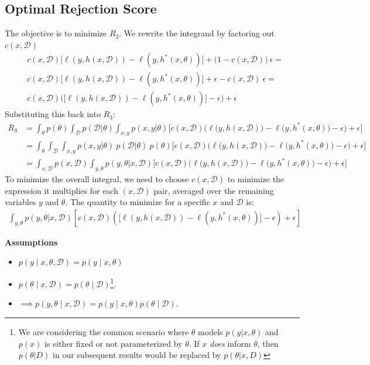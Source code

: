 \subsection{Optimal Rejection Score}
The objective is to minimize $R_3$. We rewrite the integrand by factoring out $c(x,\mathcal{D})$
\begin{align}
&c(x,\mathcal{D}) \big[ \ell(y,h(x,\mathcal{D})) - \ell(y,h^*(x,\theta)) \big]
+ \big(1 - c(x,\mathcal{D})\big)\ \epsilon = \nonumber \\
&c(x,\mathcal{D})\big[\ell(y,h(x,\mathcal{D})) - \ell(y,h^*(x,\theta))\big] + \epsilon - c(x,\mathcal{D})\ \epsilon = \nonumber \\
&c(x,\mathcal{D})\Big(\big[\ell(y,h(x,\mathcal{D})) - \ell(y,h^*(x,\theta))\big] - \epsilon\Big) + \epsilon
\end{align}
Substituting this back into $R_3$:
\begin{align}
R_{3} &= \int_{\theta} p(\theta) \int_{\mathcal{D}} p(\mathcal{D}|\theta)\int_{x,y} p(x,y|\theta) \Bigg[ c(x,\mathcal{D})\Big(\ell\big(y,h(x,\mathcal{D})\big) - \ell\big(y,h^*(x,\theta)\big) - \epsilon\Big) + \epsilon \Bigg]\nonumber \\
&= \int_{\theta} \int_{\mathcal{D}} \int_{x,y} p(x,y|\theta)\ p(\mathcal{D}|\theta) \ p(\theta) \Bigg[ c(x,\mathcal{D})\Big(\ell\big(y,h(x,\mathcal{D})\big) - \ell\big(y,h^*(x,\theta)\big) - \epsilon\Big) + \epsilon \Bigg] \nonumber \\
&= \int_{x, \mathcal{D}} p(x,\mathcal{D}) \int_{y, \theta} p(y,\theta|x,\mathcal{D}) \Bigg[ c(x,\mathcal{D})\Big(\ell\big(y,h(x,\mathcal{D})\big) - \ell\big(y,h^*(x,\theta)\big) - \epsilon\Big) + \epsilon \Bigg]
\end{align}
To minimize the overall integral, we need to choose $c(x,\mathcal{D})$ to minimize the expression it multiplies for each $(x, \mathcal{D})$ pair, averaged over the remaining variables $y$ and $\theta$. The quantity to minimize for a specific $x$ and $\mathcal{D}$ is:
\begin{align}
\int_{y,\theta} p(y,\theta|x,\mathcal{D}) \left[ c(x,\mathcal{D})\left(\big[\ell(y,h(x,\mathcal{D})) - \ell(y,h^*(x,\theta))\big] - \epsilon\right) + \epsilon \right]
\end{align}

\noindent\textbf{Assumptions}
\begin{itemize}
    \item $p(y \mid x, \theta, \mathcal{D}) = p(y \mid x, \theta)$
    \item $p(\theta \mid x, \mathcal{D}) = p(\theta \mid \mathcal{D})$\footnote{We are considering the common scenario where $\theta$ models $p(y|x, \theta)$ and $p(x)$ is either fixed or not parameterized by $\theta$. If $x$ \textit{does} inform $\theta$, then $p(\theta|D)$ in our subsequent results would be replaced by $p(\theta|x,D)$}.
    \item $\implies p(y,\theta \mid x, \mathcal{D}) = p(y \mid x, \theta) p(\theta \mid \mathcal{D})$.
\end{itemize}


